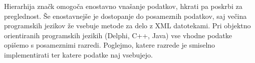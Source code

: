 \documentclass[a4paper,10pt]{article}
\begin{document}
   Hierarhija značk omogoča enostavno vnašanje podatkov, hkrati pa poskrbi za preglednost.
   Še enostavnejše je dostopanje do posameznih podatkov, saj večina programskih jezikov že
   vsebuje metode za delo z XML datotekami.
   Pri objektno orientiranih programskih jezikih (Delphi, C++, Java) vse vhodne podatke
   opišemo s posameznimi razredi. Poglejmo, katere razrede je smiselno implementirati ter
   katere podatke naj vsebujejo.
   
   
\end{document}
